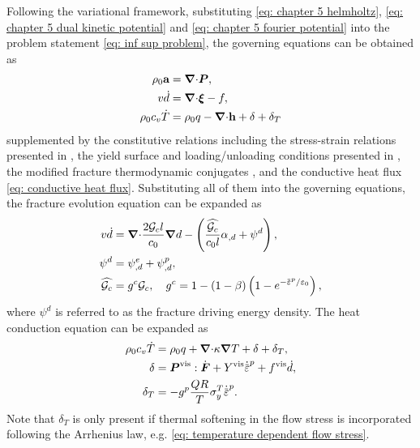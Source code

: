 Following the variational framework, substituting \eqref{eq: chapter 5 helmholtz}, \eqref{eq: chapter 5 dual kinetic potential} and \eqref{eq: chapter 5 fourier potential} into the problem statement \eqref{eq: inf sup problem}, the governing equations can be obtained as
\begin{align}
  \rho_0\textbf{a}       & ={\boldsymbol{\nabla} \cdot} \boldsymbol{P},                                \\
  v\dot{d}         & ={\boldsymbol{\nabla} \cdot} \boldsymbol{\xi} - f          ,              \\
  \rho_0c_v\dot{T} & = \rho_0 q - {\boldsymbol{\nabla} \cdot} \textbf{h} + \delta + \delta_T
\end{align}
supplemented by the constitutive relations including the stress-strain relations presented in , the yield surface and loading/unloading conditions presented in , the modified fracture thermodynamic conjugates , and the conductive heat flux \eqref{eq: conductive heat flux}. Substituting all of them into the governing equations, the fracture evolution equation can be expanded as
\begin{align}
  v\dot{d}      & =\divergence \dfrac{2\Gc l}{c_0} \grad d - \left( \dfrac{\widehat{\Gc}}{c_0 l}\alpha_{,d} + \psi^d \right), \label{eq: modified fracture evolution} \\
  \psi^d        & = \psi^e_{,d} + \psi^p_{,d}, \label{eq: fracture driving energy}                                                                                    \\
  \widehat{\Gc} & = g^c \Gc, \quad g^c = 1-(1-\beta)\left( 1-e^{-\ep/\varepsilon_0} \right),
\end{align}
where $\psi^d$ is referred to as the fracture driving energy density. The heat conduction equation can be expanded as
\begin{align}
  \rho_0c_v\dot{T} & = \rho_0 q + \divergence \kappa \grad T + \delta + \delta_T,                 \\
  \delta           & = \bfP^\text{vis}:\dot{\defgrad} + Y^\text{vis}\epdot + f^\text{vis}\dot{d}, \\
  \delta_T         & = -g^p \dfrac{QR}{T} \sigma_y^T\epdot.
\end{align}
Note that $\delta_T$ is only present if thermal softening in the flow stress is incorporated following the Arrhenius law, e.g. \eqref{eq: temperature dependent flow stress}.

